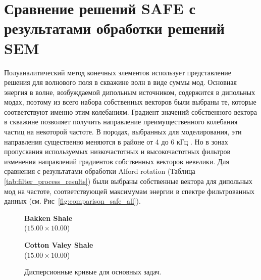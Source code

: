 \documentclass[a4paper,11pt]{article}
\begin{document}
\section{Сравнение решений SAFE с результатами обработки решений SEM}
\label{safe_comparison}

Полуаналитический метод конечных элементов использует представление решения для волнового поля в скважине волн в виде суммы мод. Основная энергия в волне, возбуждаемой дипольным источником, содержится в дипольных модах, поэтому из всего набора собственных векторов были выбраны те, которые соответствуют именно этим колебаниям. Градиент значений собственного вектора в скважине позволяет получить направление преимущественного колебания частиц на некоторой частоте. В породах, выбранных для моделирования, эти направления существенно меняются в районе от 4 до 6 кГц \cite{Zharnikov2015}. Но в зонах пропускания используемых низкочастотных и высокочастотных фильтров изменения направлений градиентов собственных векторов невелики. Для сравнения с результатами обработки Alford rotation (Таблица \ref{tab:filter_process_results}) были выбраны собственные вектора для дипольных мод на частоте, соответствующей максимумам энергии в спектре фильтрованных данных (см. Рис~\ref{fig:comparison_safe_all}).

\begin{figure}[h]
\centering
\begin{minipage}{0.49\linewidth}
	\centering \textbf{Bakken Shale} \\ ($15.00 \times 10.00$)
	 \\
\end{minipage}
\begin{minipage}{0.49\linewidth}
	\centering \textbf{Cotton Valey Shale} \\ ($15.00 \times 10.00$)
	 \\
\end{minipage}
\caption{Дисперсионные кривые для основных задач. }
\label{fig:disp_curves_all}
\end{figure}
\end{document}
